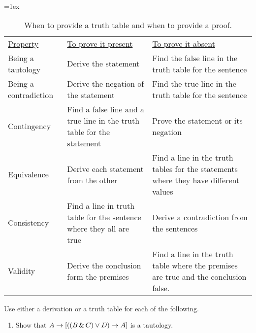 {\begin{table}
\tabulinesep=1ex
\begin{mdframed}[style=mytablebox]
\begin{tabu}{X[.5,l,b] X[1,l,b] X[1,l,b]}
\underline{Property}		& \underline{To prove it present} 	&	\underline{To prove it absent} \\ 
Being a tautology 			& Derive the statement  						& Find the false line in the truth table for the sentence \\ 
Being a contradiction 		&  Derive the negation of the statement  		 & Find the true line in the truth table for the sentence\\ 
Contingency			 		& Find a false line and a true line in the truth table for the statement & Prove the statement or its negation\\ 
Equivalence 					& Derive each statement from the other 		 & Find a line in the truth tables for the statements where they have different values\\ 
Consistency	 				& Find a line in truth table for the sentence where they all are true & Derive a contradiction from the sentences\\ 
Validity		 				& Derive the conclusion form the premises & Find a line in the truth table where the premises are true and the conclusion false. \\ 
\end{tabu}
\end{mdframed}
\caption{When to provide a truth table and when to provide a proof.}
\label{table.ProofOrModel}
\end{table}



\practiceproblems
\noindent\problempart Use either a derivation or a truth table for each of the following. 
\begin{enumerate}[label=(\arabic*)]
\item Show that $A \rightarrow [((B \,\&\, C) \vee D) \rightarrow A]$ is a tautology.


\end{enumerate}}
